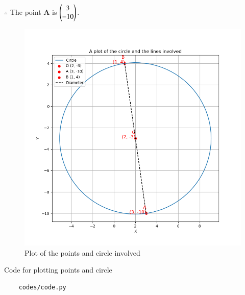\documentclass[journal]{IEEEtran}
\begin{document}
$\therefore$ The point \textbf{A} is $\begin{pmatrix}3 \\ -10\end{pmatrix}$. \\

\begin{figure}[H]
   \centering
   \includegraphics[width=0.7\columnwidth]{figs/Figure_1.png}
   \caption{Plot of the points and circle involved}
   \label{Fig}
\end{figure}

Code for plotting points and circle
\begin{lstlisting}
	codes/code.py
\end{lstlisting}
\end{document}
